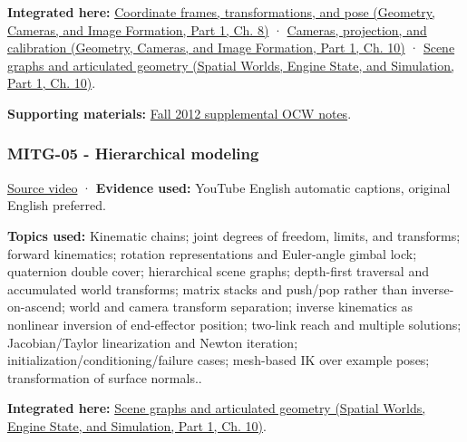 \textbf{Integrated here:} \href{../03-Geometry-Cameras-and-Image-Formation-P01/main.pdf\#nameddest=03-visual-computing-i-ch001-coordinate-frames-transformations-and-pose}{Coordinate frames, transformations, and pose (Geometry, Cameras, and Image Formation, Part 1, Ch. 8)} · \href{../03-Geometry-Cameras-and-Image-Formation-P01/main.pdf\#nameddest=03-visual-computing-i-ch003-cameras-projection-and-calibration}{Cameras, projection, and calibration (Geometry, Cameras, and Image Formation, Part 1, Ch. 10)} · \href{../05-Spatial-Worlds-Engine-State-and-Simulation-P01/main.pdf\#nameddest=04-visual-computing-ii-ch029-scene-graphs-and-articulated-geometry}{Scene graphs and articulated geometry (Spatial Worlds, Engine State, and Simulation, Part 1, Ch. 10)}.

\textbf{Supporting materials:} \href{https://ocw.mit.edu/courses/6-837-computer-graphics-fall-2012/pages/lecture-notes/}{Fall 2012 supplemental OCW notes}.

\subsubsection{MITG-05 - Hierarchical modeling}\label{04-visual-computing-ii-ch036-mitg-05---hierarchical-modeling}

\hypertarget{04-visual-computing-ii-ch036-mitg-05---hierarchical-modeling}{}

\href{https://www.youtube.com/watch?v=-Dhx44D0Iok}{Source video} · \textbf{Evidence used:} YouTube English automatic captions, original English preferred.

\textbf{Topics used:} Kinematic chains; joint degrees of freedom, limits, and transforms; forward kinematics; rotation representations and Euler-angle gimbal lock; quaternion double cover; hierarchical scene graphs; depth-first traversal and accumulated world transforms; matrix stacks and push/pop rather than inverse-on-ascend; world and camera transform separation; inverse kinematics as nonlinear inversion of end-effector position; two-link reach and multiple solutions; Jacobian/Taylor linearization and Newton iteration; initialization/conditioning/failure cases; mesh-based IK over example poses; transformation of surface normals..

\textbf{Integrated here:} \href{../05-Spatial-Worlds-Engine-State-and-Simulation-P01/main.pdf\#nameddest=04-visual-computing-ii-ch029-scene-graphs-and-articulated-geometry}{Scene graphs and articulated geometry (Spatial Worlds, Engine State, and Simulation, Part 1, Ch. 10)}.


